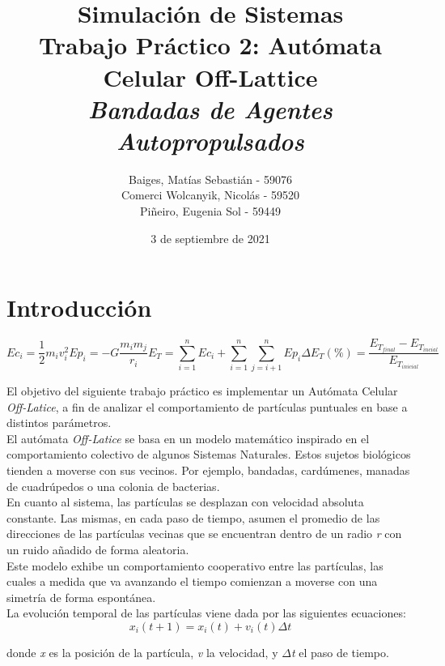 \documentclass[12pt, a4paper]{report}
\title{%
\textbf{Simulación de Sistemas}\\
Trabajo Práctico 2: Autómata Celular Off-Lattice \\
\large \emph{Bandadas de Agentes Autopropulsados}
}
\author{Baiges, Matías Sebastián - 59076\\
Comerci Wolcanyik, Nicolás - 59520\\
Piñeiro, Eugenia Sol - 59449
}
\date{3 de septiembre de 2021}
\begin{document}
\maketitle

\tableofcontents
\newpage

\section{Introducción}

\begin{equation}
    \label{eq:velocity}
    Ec_i = \frac{1}{2} m_i v_i^2   Ep_i = -G \frac{m_i m_j}{r_i} E_T = \sum_{i = 1}^{n}  Ec_i + \sum_{i = 1}^{n} \sum_{j = i+1}^{n} Ep_i  \Delta E_T(\%) = \frac{ E_{T_{final}} - E_{T_{incial}} } { E_{T_{inicial}} }
\end{equation}

El objetivo del siguiente trabajo práctico es implementar un Autómata Celular \emph{Off-Latice}, 
a fin de analizar el comportamiento de partículas puntuales en base a distintos parámetros.\\

El autómata \emph{Off-Latice} se basa en un modelo matemático inspirado en el comportamiento colectivo de algunos Sistemas Naturales. Estos sujetos biológicos tienden a moverse con sus vecinos. Por ejemplo, bandadas, cardúmenes, manadas de cuadrúpedos o una colonia de bacterias.\cite{vicsek1995novel}\\

En cuanto al sistema, las partículas se desplazan con velocidad absoluta constante. Las mismas, en cada paso de tiempo, asumen el promedio de las direcciones de las partículas vecinas que se encuentran dentro de un radio \emph{r} con un ruido añadido de forma aleatoria.\\

Este modelo exhibe un comportamiento cooperativo entre las partículas, las cuales a medida que va avanzando el tiempo comienzan a moverse con una simetría de forma espontánea.\\ 

La evolución temporal de las partículas viene dada por las siguientes ecuaciones: 
\begin{equation}
\label{eq:velocity}
x_i(t+1) = x_i(t) + v_i(t) \Delta t 
\end{equation}

donde \emph{x} es la posición de la partícula, \emph{v} la velocidad, y $\Delta$\emph{t} el paso de tiempo.  
\end{document}
